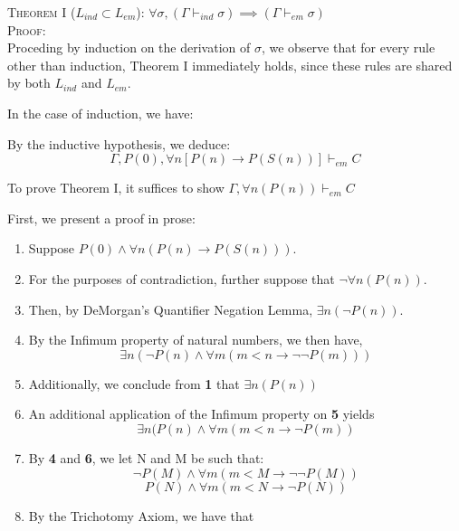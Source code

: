 \documentclass[article]{journal}
\begin{document}
\textsc{Theorem I} ($L_{ind} \subset L_{em}$): $\forall \sigma, (\Gamma \vdash_{ind} \sigma) \implies (\Gamma \vdash_{em} \sigma)$ \\

\textsc{Proof:} \\
Proceding by induction on the derivation of $\sigma$, we observe that for every rule other than induction, Theorem I immediately holds, since these rules are shared by both $L_{ind}$ and $L_{em}$.

In the case of induction, we have: 
\begin{prooftree}
\end{prooftree}

By the inductive hypothesis, we deduce: $$\Gamma, P(0), \forall n[P(n) \to P(S(n))] \vdash_{em} C $$

To prove Theorem I, it suffices to show $\Gamma, \forall n(P(n)) \vdash_{em} C $

First, we present a proof in prose:

\begin{enumerate}
\item Suppose $P(0) \wedge \forall n(P(n) \to P(S(n)))$.
\item For the purposes of contradiction, further suppose that $\lnot\forall n(P(n))$.
\item Then, by DeMorgan's Quantifier Negation Lemma, $\exists n(\lnot P(n))$.
\item By the Infimum property of natural numbers, we then have, $$\exists n(\lnot P(n) \wedge \forall m(m<n \to \lnot\lnot P(m)))$$
\item Additionally, we conclude from \textbf{1} that $\exists n(P(n))$
\item An additional application of the Infimum property on \textbf{5} yields $$\exists n(P(n) \wedge \forall m(m<n \to \lnot P(m))$$
\item By \textbf{4} and \textbf{6}, we let N and M be such that:
$$\lnot P(M) \wedge \forall m(m<M \to \lnot\lnot P(M))$$
$$P(N) \wedge \forall m(m<N \to \lnot P(N))$$
\item By the Trichotomy Axiom, we have that 

\end{enumerate}
\end{document}
